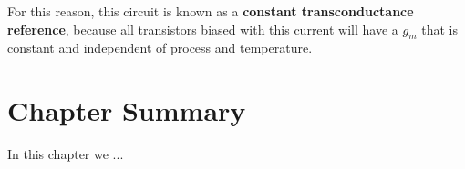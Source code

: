 For this reason, this circuit is known as a \textbf{constant transconductance reference}, because all transistors biased with this current will have a $g_m$ that is constant and independent of process and temperature.
\newpage
\section{Chapter Summary}
In this chapter we ...
